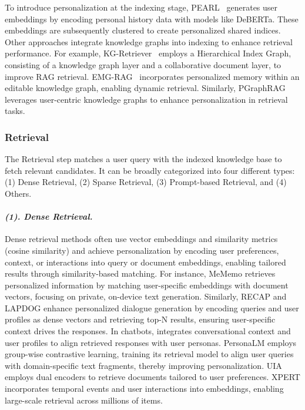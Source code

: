 To introduce personalization at the indexing stage, PEARL~\cite{mysore2023pearl} generates user embeddings by encoding personal history data with models like DeBERTa. These embeddings are subsequently clustered to create personalized shared indices. Other approaches integrate knowledge graphs into indexing to enhance retrieval performance. For example, KG-Retriever~\cite{chen2024kg} employs a Hierarchical Index Graph, consisting of a knowledge graph layer and a collaborative document layer, to improve RAG retrieval. EMG-RAG~\cite{wang2024crafting} incorporates personalized memory within an editable knowledge graph, enabling dynamic retrieval. Similarly, PGraphRAG~\cite{au2025personalized} leverages user-centric knowledge graphs to enhance personalization in retrieval tasks.


\subsubsection{\textbf{Retrieval}}
The Retrieval step matches a user query with the indexed knowledge base to fetch relevant candidates. It can be broadly categorized into four different types: (1) Dense Retrieval,  (2) Sparse Retrieval, (3) Prompt-based Retrieval, and  (4) Others.

\paragraph{\textbf{\textit{{(1). Dense Retrieval.}}}}
Dense retrieval methods often use vector embeddings and similarity metrics (\eg cosine similarity) and achieve personalization by encoding user preferences, context, or interactions into query or document embeddings, enabling tailored results through similarity-based matching. For instance, MeMemo \cite{wang2024mememo} retrieves personalized information by matching user-specific embeddings with document vectors, focusing on private, on-device text generation. Similarly, RECAP \cite{liu2023recap} and LAPDOG \cite{huang2024learning} enhance personalized dialogue generation by encoding queries and user profiles as dense vectors and retrieving top-N results, ensuring user-specific context drives the responses. In chatbots, \citet{gu2021partner} integrates conversational context and user profiles to align retrieved responses with user personas. PersonaLM \cite{mathur2023personalm} employs group-wise contrastive learning, training its retrieval model to align user queries with domain-specific text fragments, thereby improving personalization. UIA \cite{zeng2023personalized} employs dual encoders to retrieve documents tailored to user preferences. XPERT \cite{vemuri2023personalized} incorporates temporal events and user interactions into embeddings, enabling large-scale retrieval across millions of items.

